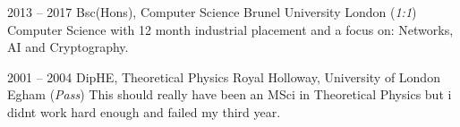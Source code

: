 \cventry
{2013 -- 2017}
{Bsc(Hons), Computer Science}
{Brunel University}
{London}
{(\textit{1:1})}
{
    Computer Science with 12 month industrial placement and a focus on: Networks,
    AI and Cryptography. \\ 
}

\cventry
{2001 -- 2004}
{DipHE, Theoretical Physics}
{Royal Holloway, University of London}
{Egham}
{(\textit{Pass})}
{
    This should really have been an MSci in Theoretical Physics but i didnt work
    hard enough and failed my third year.
}

